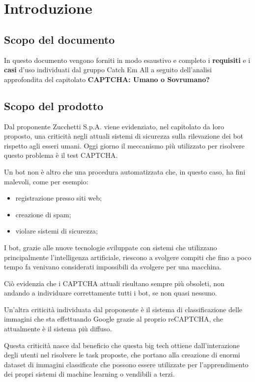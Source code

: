 \section{Introduzione}

\subsection{Scopo del documento}
In questo documento vengono forniti in modo esaustivo e completo i \textbf{requisiti} e i \textbf{casi} d’uso individuati dal gruppo Catch Em All a seguito dell’analisi approfondita del capitolato \textbf{CAPTCHA: Umano o Sovrumano?}

\subsection{Scopo del prodotto}
Dal proponente Zucchetti S.p.A. viene evidenziato, nel capitolato da loro proposto, una criticità negli attuali sistemi di sicurezza sulla rilevazione dei bot rispetto agli esseri umani. Oggi giorno il meccanismo più utilizzato per risolvere questo problema è il test CAPTCHA.

Un bot non è altro che una procedura automatizzata che, in questo caso, ha fini malevoli, come per esempio:
\begin{itemize}
 	\item registrazione presso siti web;
	\item creazione di spam;
	\item violare sistemi di sicurezza;
\end{itemize}
I bot, grazie alle nuove tecnologie sviluppate con sistemi che utilizzano principalmente l’intelligenza artificiale, riescono a svolgere compiti che fino a poco tempo fa venivano considerati impossibili da svolgere per una macchina.

Ciò evidenzia che i CAPTCHA attuali risultano sempre più obsoleti, non andando a individuare correttamente tutti i bot, se non quasi nessuno.

Un'altra criticità individuata dal proponente è il sistema di classificazione delle immagini che sta effettuando Google grazie al proprio reCAPTCHA, che attualmente è il sistema più diffuso.

Questa criticità nasce dal beneficio che questa big tech ottiene dall’interazione degli utenti nel risolvere le task proposte, che portano alla creazione di enormi dataset di immagini classificate che possono essere utilizzate per l’apprendimento dei propri sistemi di machine learning o vendibili a terzi.

